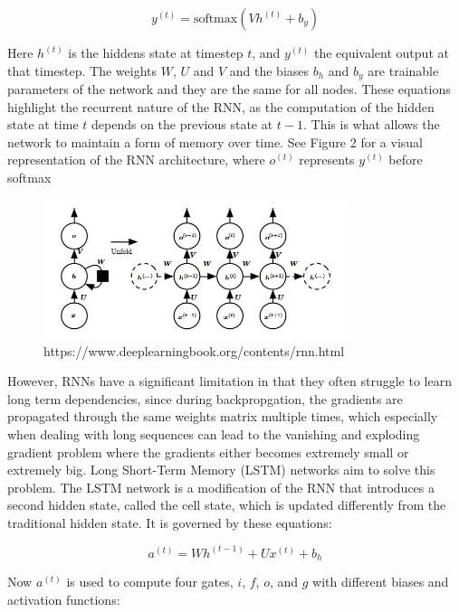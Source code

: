 \documentclass[11pt]{article}
\begin{document}
\begin{equation}
y^{(t)} = \text{softmax}(Vh^{(t)} + b_y)
\end{equation}

Here \(h^{(t)}\) is the hiddens state at timestep $t$, and \(y^{(t)}\) the equivalent output at that timestep. The weights $W$, $U$ and $V$ and the biases $b_h$ and $b_y$ are trainable parameters of the network and they are the same for all nodes. These equations highlight the recurrent nature of the RNN, as the computation of the hidden state at time $t$ depends on the previous state at $t-1$. This is what allows the network to maintain a form of memory over time. See Figure 2 for a visual representation of the RNN architecture, where $o^{(t)}$ represents $y^{(t)}$ before softmax

\begin{figure}[h]
\centering
\includegraphics[width=0.8\textwidth]{rnn_diagram.jpeg}
\caption{https://www.deeplearningbook.org/contents/rnn.html}
\end{figure}

However, RNNs have a significant limitation in that they often struggle to learn long term dependencies, since during backpropgation, the gradients are propagated through the same weights matrix multiple times, which especially when dealing with long sequences can lead to the vanishing and exploding gradient problem where the gradients either becomes extremely small or extremely big. Long Short-Term Memory (LSTM) networks  aim to solve this problem. The LSTM network is a modification of the RNN that introduces a second hidden state, called the cell state, which is updated differently from the traditional hidden state. It is governed by these equations:

\begin{equation} a^{(t)} = Wh^{(t-1)} + Ux^{(t)} + b_h\end{equation}

Now $a^{(t)}$ is used to compute four gates, $i$, $f$, $o$, and $g$ with different biases and activation functions:
\end{document}
